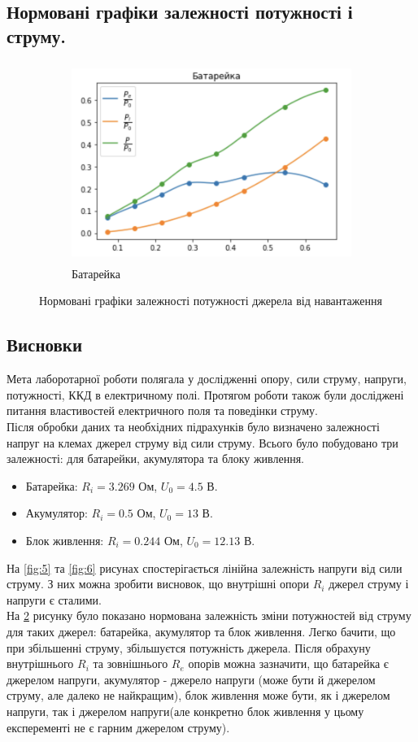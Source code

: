 \documentclass[a4paper,12pt]{article}
\begin{document}
\begin{justify}
	\subsection{Нормовані графіки залежності потужності і струму.}
	 \begin{figure}[!h]
		\centering
		\begin{subfigure}{0.6\linewidth}
			\includegraphics[height=65mm]{media/graph7aaaa.png}
    		\caption{Батарейка}
			\label{fig:8a}
    	\end{subfigure}\hfill

		\caption{Нормовані графіки залежності потужності джерела від навантаження}
		\label{fig:8}
	\end{figure}
		
	\subsection{Висновки}	
	Мета лаборотарної роботи полягала у дослідженні опору, сили струму, напруги, потужності, ККД в електричному полі. Протягом роботи також були досліджені питання властивостей електричного поля та поведінки струму. \\Після обробки даних та необхідних підрахунків було визначено залежності напруг на клемах джерел струму від сили струму. Всього було побудовано три залежності: для батарейки, акумулятора та блоку живлення. 
	\begin{itemize}
		\item Батарейка: $R_i=3.269$ Ом, $U_0=4.5$ В.
		\item Акумулятор: $R_i=0.5$ Ом, $U_0=13$ В.
		\item Блок живлення: $R_i=0.244$ Ом, $U_0=12.13$ В.
	\end{itemize} 
	На \ref{fig:5} та \ref{fig:6} рисунах спостерігається лінійна залежність напруги від сили струму. З них можна зробити висновок, що  внутрішні опори $R_i$ джерел струму і напруги є сталими. \\
	На \ref{fig:8} рисунку було показано нормована залежність зміни потужностей від струму для таких джерел: батарейка, акумулятор та блок живлення. Легко бачити, що при збільшенні струму, збільшуєтся потужність джерела. Після обрахуну внутрішнього $R_i$ та зовнішнього $R_e$ опорів можна зазначити, що батарейка є джерелом напруги, акумулятор - джерело напруги (може бути й джерелом струму, але далеко не найкращим), блок живлення може бути, як і джерелом напруги, так і джерелом напруги(але конкретно блок живлення у цьому експеременті не є гарним джерелом струму). 

\end{justify}
\end{document}
